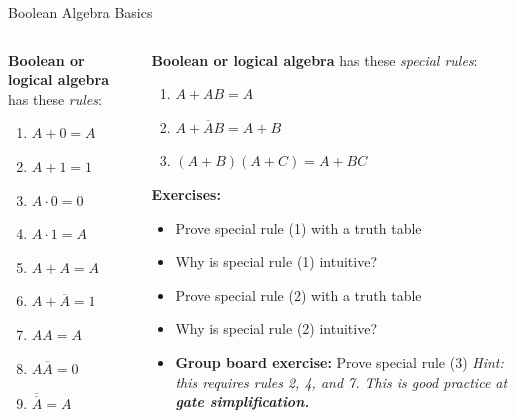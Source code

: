\documentclass{beamer}
\begin{document}
\begin{frame}{Boolean Algebra Basics}
\small
\begin{columns}[T]
\begin{column}{0.5\textwidth}
\textbf{Boolean or logical algebra} has these \textit{rules}:
\begin{enumerate}
\item $A+0 = A$
\item $A+1=1$
\item $A\cdot 0=0$
\item $A\cdot 1=A$
\item $A+A=A$
\item $A+\overline{A}=1$
\item $AA = A$
\item $A\overline{A}=0$
\item $\overline{\overline{A}} = A$
\end{enumerate}
\end{column}
\begin{column}{0.5\textwidth}
\textbf{Boolean or logical algebra} has these \textit{special rules}:
\begin{enumerate}
\item $A+AB = A$
\item $A+\overline{A}B=A+B$
\item $(A+B)(A+C) = A+BC$
\end{enumerate} \vspace{0.2cm}
\tiny
\textbf{Exercises:} \\ \hrulefill
\begin{itemize}
\item Prove special rule (1) with a truth table
\item Why is special rule (1) intuitive?
\item Prove special rule (2) with a truth table
\item Why is special rule (2) intuitive?
\item \textbf{Group board exercise:} Prove special rule (3) \textit{Hint: this requires rules 2, 4, and 7.  This is good practice at \textbf{gate simplification.}}
\end{itemize}
\end{column}
\end{columns}
\end{frame}
\end{document}
